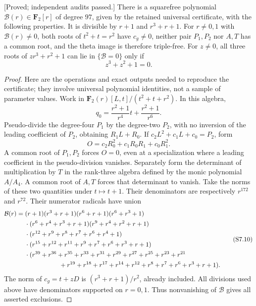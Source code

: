 \begin{lemma}
\label{lem:uniform-seven-parameter-certificate-candidate}
\textup{[Proved; independent audits passed.]}
There is a squarefree polynomial $\mathcal B(r)\in\mathbf F_2[r]$
of degree $97$, given by the retained universal certificate, with
the following properties. It is divisible by $r+1$ and
$r^3+r+1$. For $r\ne0,1$ with $\mathcal B(r)\ne0$, both roots
of $t^2+t=r^2$ have $c_g\ne0$, neither pair $P_1,P_2$ nor $A,T$
has a common root, and the theta image is therefore triple-free.
For $z\ne0$, all three roots of $zr^3+r^2+1$ can lie in
$\{\mathcal B=0\}$ only if
\[
                         z^3+z^2+1=0.           \tag{S7.9}
\]
\end{lemma}

\begin{proof}
Here are the operations and exact outputs needed to reproduce the
certificate; they involve universal polynomial identities, not a
sample of parameter values. Work in
$\mathbf F_2(r)[L,t]/(t^2+t+r^2)$. In this algebra,
\[
 q_0=\frac{r^2+1}{r^4}t+\frac{r^2+1}{r^6}.
\]
Pseudo-divide the degree-four $P_1$ by the degree-two $P_2$, with
no inversion of the leading coefficient of $P_2$, obtaining
$R_1L+R_0$. If $c_2L^2+c_1L+c_0=P_2$, form
\[
 O=c_2R_0^2+c_1R_0R_1+c_0R_1^2.
\]
A common root of $P_1,P_2$ forces $O=0$, even at a specialization
where a leading coefficient in the pseudo-division vanishes.
Separately form the determinant of multiplication by $T$ in the
rank-three algebra defined by the monic polynomial $A/A_4$.
A common root of $A,T$ forces that determinant to vanish. Take the
norms of these two quantities under $t\mapsto t+1$.
Their denominators are respectively $r^{172}$ and $r^{72}$.
Their numerator radicals have union
\[
\begin{aligned}
\mathcal B(r)={}&(r+1)(r^3+r+1)(r^6+r+1)(r^6+r^3+1)\\
 &\cdot(r^6+r^4+r^3+r+1)(r^9+r^4+r^2+r+1)\\
 &\cdot(r^{12}+r^9+r^8+r^7+r^6+r^4+1)\\
 &\cdot(r^{15}+r^{12}+r^{11}+r^9+r^7+r^6+r^3+r+1)\\
 &\cdot(r^{39}+r^{36}+r^{35}+r^{33}+r^{31}+r^{29}
       +r^{27}+r^{25}+r^{23}+r^{21}\\
 &\hspace{19mm}+r^{19}+r^{18}+r^{17}+r^{14}+r^{12}
       +r^8+r^7+r^6+r^3+r+1).
\end{aligned}                                                     \tag{S7.10}
\]
The norm of $c_g=t+zD$ is $(r^3+r+1)/r^2$, already included.
All divisions used above have denominators supported on $r=0,1$.
Thus nonvanishing of $\mathcal B$ gives all asserted exclusions.


\end{proof}
